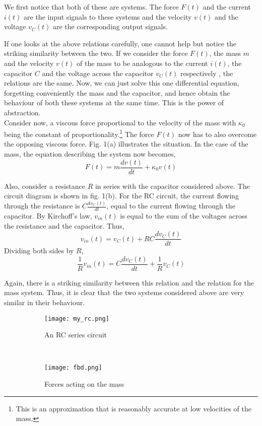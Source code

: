 We first notice that both of these are systems. The force $F(t)$ and the current $i(t)$ are the input signals to these systems and the velocity $v(t)$ and the voltage $v_{C}(t)$ are the corresponding output signals.

If one looks at the above relations carefully, one cannot help
but notice the striking similarity between the two. If we consider the
force $F(t)$, the mass $m$ and the velocity $v(t)$ of the mass to be
analogous to the current $i(t)$, the capacitor $C$ and the voltage
across the capacitor $v_{C}(t)$ respectively , the relations are the same. Now, we can just solve this one differential equation, forgetting conveniently the mass and the capacitor, and hence obtain the behaviour of both these systems at the same time. This is the power of abstraction.\\

Consider now, a viscous force proportional to the velocity of the mass with $\kappa_{0}$ being the constant of proportionality.\footnote{This is an approximation that is reasonably accurate at low velocities of the mass.} The force $F(t)$ now has to also overcome the opposing viscous force. Fig. 1(a) illustrates the situation. In the case of the mass, the equation describing the system now becomes,
\[
F(t) = m\frac{dv(t)}{dt} + \kappa_{0}v(t)
\]

Also, consider a resistance $R$ in series with the capacitor considered above. The circuit diagram is shown in fig. 1(b). For the RC circuit, the current flowing through the resistance is $C\frac{dv_{C}(t)}{dt}$, equal to the current flowing through the capacitor. By Kirchoff's law, $v_{in}(t)$ is equal to the sum of the voltages across the resistance and the capacitor. Thus,
\[
v_{in}(t) = v_{C}(t) + RC\frac{dv_{C}(t)}{dt}
\]
Dividing both sides by $R$,
\[
\frac{1}{R}v_{in}(t) = C\frac{dv_{C}(t)}{dt} + \frac{1}{R}v_{C}(t)
\]

Again, there is a striking similarity between this relation and the relation for the mass system. Thus, it is clear that the two systems considered above are very similar in their behaviour.

\begin{figure}[H]
        \centering
        \begin{subfigure}[b]{0.4\textwidth}
                \texttt{[image: my\_rc.png]}
                \caption{An RC series circuit}
        \end{subfigure}
        \quad
	~
        \begin{subfigure}[b]{0.5\textwidth}
                \texttt{[image: fbd.png]}
                \caption{Forces acting on the mass}
        \end{subfigure}
        \caption{}
\end{figure}



